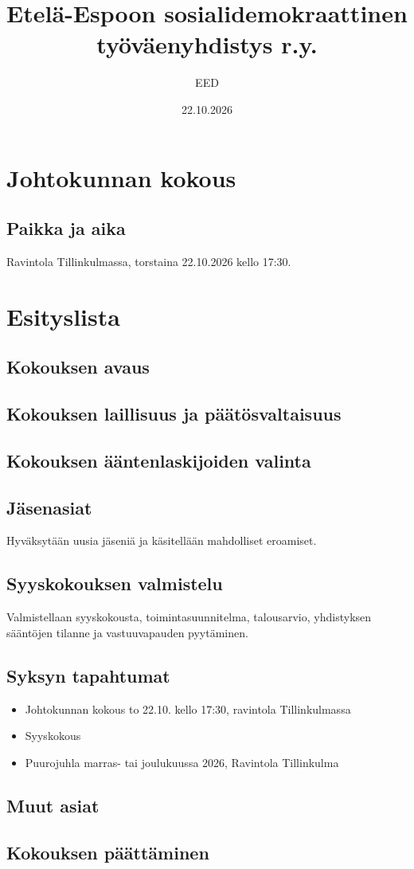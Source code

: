 \documentclass[a4paper,12pt]{article}
\title{Etelä-Espoon sosialidemokraattinen työväenyhdistys r.y.}
\author{EED}
\date{22.10.2026}
\begin{document}
\maketitle
\tableofcontents
\section*{Johtokunnan kokous}
\subsection*{Paikka ja aika}
Ravintola Tillinkulmassa, torstaina 22.10.2026 kello 17:30.
\section*{Esityslista}
\subsection{Kokouksen avaus}
\subsection{Kokouksen laillisuus ja päätösvaltaisuus}
\subsection{Kokouksen ääntenlaskijoiden valinta}
\subsection{Jäsenasiat}
Hyväksytään uusia jäseniä ja käsitellään mahdolliset eroamiset.
\subsection{Syyskokouksen valmistelu}
Valmistellaan syyskokousta, toimintasuunnitelma, talousarvio, yhdistyksen sääntöjen tilanne ja vastuuvapauden pyytäminen.
\subsection{Syksyn tapahtumat}
\begin{itemize}
\item{Johtokunnan kokous} to 22.10. kello 17:30, ravintola Tillinkulmassa
\item{Syyskokous}
\item{Puurojuhla} marras- tai joulukuussa 2026, Ravintola Tillinkulma
\end{itemize}
\subsection{Muut asiat}
\subsection{Kokouksen päättäminen}
\end{document}

